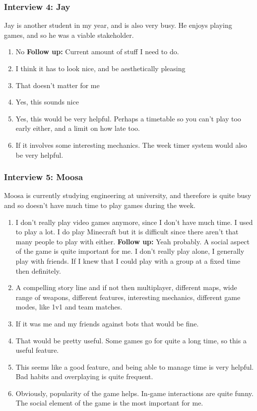 \vs
\subsubsection{Interview 4: Jay}
Jay is another student in my year, and is also very busy. He enjoys playing games, and so he was a viable stakeholder.

\vs
\begin{enumerate}[label=\arabic*)]
    \item No
    \subitem \textbf{Follow up:} Current amount of stuff I need to do.
    \item I think it has to look nice, and be aesthetically pleasing
    \item That doesn't matter for me
    \item Yes, this sounds nice
    \item Yes, this would be very helpful. Perhaps a timetable so you can't play too early either, and a limit on how late too.
    \item If it involves some interesting mechanics. The week timer system would also be very helpful.
\end{enumerate}

\vs
\subsubsection{Interview 5: Moosa}
Moosa is currently studying engineering at university, and therefore is quite busy and so doesn't have much time to play games during the week.

\vs
\begin{enumerate}[label=\arabic*)]
    \item I don't really play video games anymore, since I don't have much time. I used to play a lot. I do play Minecraft but it is difficult since there aren't that many people to play with either.
    \subitem \textbf{Follow up:} Yeah probably. A social aspect of the game is quite important for me. I don't really play alone, I generally play with friends. If I knew that I could play with a group at a fixed time then definitely.
    \item A compelling story line and if not then multiplayer, different maps, wide range of weapons, different features, interesting mechanics, different game modes, like 1v1 and team matches.
    \item If it was me and my friends against bots that would be fine.
    \item That would be pretty useful. Some games go for quite a long time, so this a useful feature.
    \item This seems like a good feature, and being able to manage time is very helpful. Bad habits and overplaying is quite frequent.
    \item Obviously, popularity of the game helps. In-game interactions are quite funny. The social element of the game is the most important for me.
\end{enumerate}

